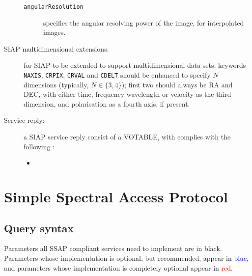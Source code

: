 \begin{description}
\begin{description}
			\item[\texttt{angularResolution}] specifies the angular 
			resolving power of the image, for interpolated images.
		\end{description}
		
		
		\item[SIAP multidimensional extensions:] for SIAP to be 
		extended to support multidimensional data sets, keywords 
		\texttt{NAXIS}, \texttt{CRPIX}, \texttt{CRVAL} and 
		\texttt{CDELT} should be enhanced to specify $N$ dimensions 
		(typically, $N \in \{3,4\}$); first two should always be RA and 
		DEC, with either time, frequency wavelength or velocity as 
		the third dimension, and polarisation as a fourth axis, if 
		present.
		
		\item[Service reply:] a SIAP service reply consist of a 
		VOTABLE, with complies with the following :

		\begin{itemize}
			\item {}
		\end{itemize}
		
	\end{description}
	
	\section{Simple Spectral Access Protocol} %
	\label{sec:ssap}
	
	\subsection{Query syntax} %
	\label{sub:query_syntax}

	Parameters all SSAP compliant services need to implement are in 
	black. Parameters whose implementation is optional, but 
	recommended, appear in \textcolor{blue}{blue}, and parameters 
	whose implementation is completely optional appear in 
	\textcolor{red}{red}.

